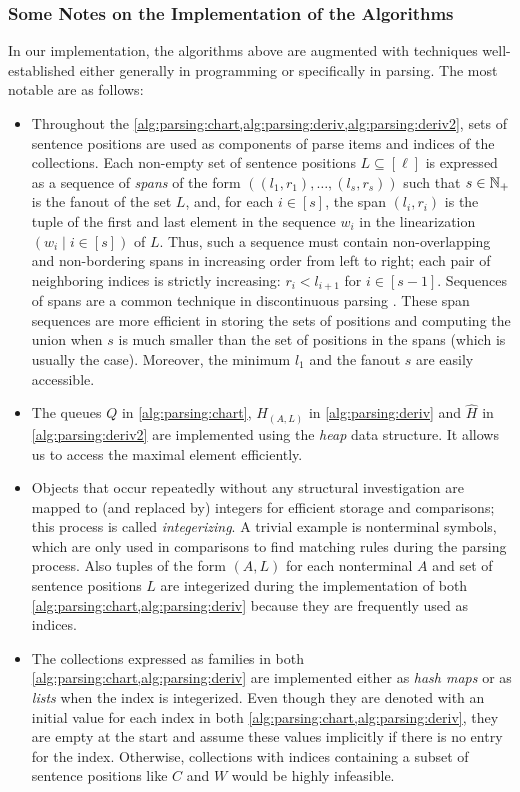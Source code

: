 \documentclass[../../document.tex]{subfiles}
\begin{document}
    \subsubsection*{Some Notes on the Implementation of the Algorithms}
    In our implementation, the algorithms above are augmented with techniques well-established either generally in programming or specifically in parsing.
    The most notable are as follows:
    \begin{itemize}
        \item Throughout the \cref{alg:parsing:chart,alg:parsing:deriv,alg:parsing:deriv2}, sets of sentence positions are used as components of parse items and indices of the collections.
            Each non-empty set of sentence positions \(L \subseteq [\ell]\) is expressed as a sequence of \emph{spans} of the form \(((l_1, r_1), \ldots, (l_s, r_s))\) such that \(s\in \mathbb{N}_+\) is the fanout of the set \(L\), and, for each \(i \in [s]\), the span \((l_i, r_i)\) is the tuple of the first and last element in the sequence \(w_i\) in the linearization \((w_i \mid i \in [s])\) of \(L\).
            Thus, such a sequence must contain non-overlapping and non-bordering spans in increasing order from left to right; each pair of neighboring indices is strictly increasing: \(r_i < l_{i+1}\) for \(i \in [s-1]\).
            Sequences of spans are a common technique in discontinuous parsing \citep[e.g.][cf.\@ range vector in Definition~6.6]{Kal10}.
            These span sequences are more efficient in storing the sets of positions and computing the union when \(s\) is much smaller than the set of positions in the spans (which is usually the case).
            Moreover, the minimum \(l_1\) and the fanout \(s\) are easily accessible.
        \item The queues \(Q\) in \cref{alg:parsing:chart}, \(H_{(A,L)}\) in \cref{alg:parsing:deriv} and \(\hat{H}\) in \cref{alg:parsing:deriv2} are implemented using the \emph{heap} data structure.
            It allows us to access the maximal element efficiently.
        \item Objects that occur repeatedly without any structural investigation are mapped to (and replaced by) integers for efficient storage and comparisons; this process is called \emph{integerizing}.
            A trivial example is nonterminal symbols, which are only used in comparisons to find matching rules during the parsing process.
            Also tuples of the form \((A, L)\) for each nonterminal \(A\) and set of sentence positions \(L\) are integerized during the implementation of both \cref{alg:parsing:chart,alg:parsing:deriv} because they are frequently used as indices.
        \item The collections expressed as families in both \cref{alg:parsing:chart,alg:parsing:deriv} are implemented either as \emph{hash maps} or as \emph{lists} when the index is integerized.
            Even though they are denoted with an initial value for each index in both \cref{alg:parsing:chart,alg:parsing:deriv}, they are empty at the start and assume these values implicitly if there is no entry for the index.
            Otherwise, collections with indices containing a subset of sentence positions like \(C\) and \(W\) would be highly infeasible.
    \end{itemize}
\end{document}
